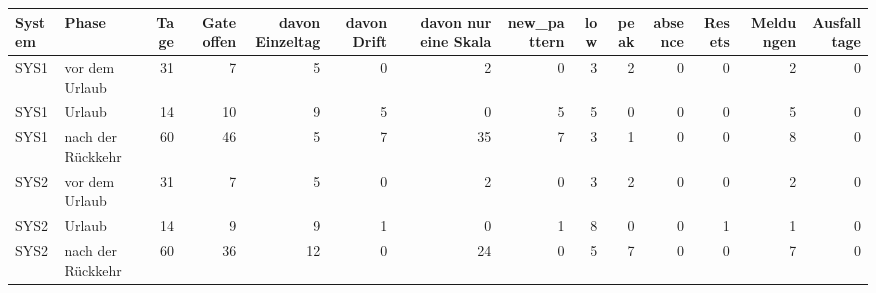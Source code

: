 \begin{tabular}{llrrrrrrrrrrrr}
\toprule
System & Phase & Tage & Gate offen & davon Einzeltag & davon Drift & davon nur eine Skala & new\_pattern & low & peak & absence & Resets & Meldungen & Ausfalltage \\
\midrule
SYS1 & vor dem Urlaub & 31 & 7 & 5 & 0 & 2 & 0 & 3 & 2 & 0 & 0 & 2 & 0 \\
SYS1 & Urlaub & 14 & 10 & 9 & 5 & 0 & 5 & 5 & 0 & 0 & 0 & 5 & 0 \\
SYS1 & nach der Rückkehr & 60 & 46 & 5 & 7 & 35 & 7 & 3 & 1 & 0 & 0 & 8 & 0 \\
SYS2 & vor dem Urlaub & 31 & 7 & 5 & 0 & 2 & 0 & 3 & 2 & 0 & 0 & 2 & 0 \\
SYS2 & Urlaub & 14 & 9 & 9 & 1 & 0 & 1 & 8 & 0 & 0 & 1 & 1 & 0 \\
SYS2 & nach der Rückkehr & 60 & 36 & 12 & 0 & 24 & 0 & 5 & 7 & 0 & 0 & 7 & 0 \\
\bottomrule
\end{tabular}
